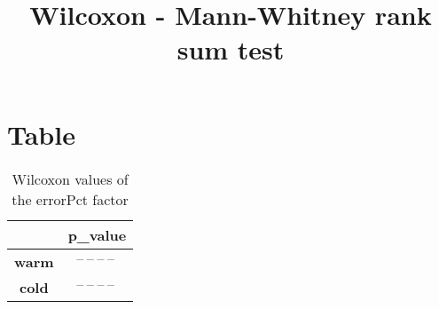 \documentclass{article}
\title{Wilcoxon - Mann-Whitney rank sum test}
\author{}
\begin{document}
\maketitle
\section{Table}
\begin{table}[!htp]
  \caption{Wilcoxon values of the errorPct factor}
  \label{table:errorPct}
  \centering
  \begin{scriptsize}
  \begin{tabular}{c|c}
      & \textbf{p\_value} \\\hline
      \textbf{warm} & $\text{--}\ \text{--}\ \text{--}\ \text{--}\ $ \\
      \textbf{cold} & $\text{--}\ \text{--}\ \text{--}\ \text{--}\ $ \\
  \end{tabular}
  \end{scriptsize}
\end{table}
\end{document}
